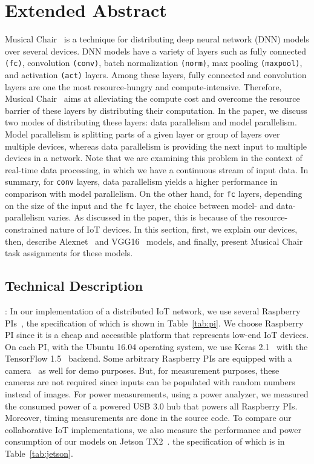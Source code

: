 \documentclass[sigplan]{acmart}
\begin{document}
\section{Extended Abstract}

Musical Chair~\cite{musical-chair} is a technique for distributing deep neural network (DNN) models over several devices. DNN models have a variety of layers such as fully connected \texttt{(fc)}, convolution \texttt{(conv)}, batch normalization \texttt{(norm)}, max pooling \texttt{(maxpool)}, and activation \texttt{(act)} layers. Among these layers, fully connected and convolution layers are one the most resource-hungry and compute-intensive. Therefore, Musical Chair~\cite{musical-chair} aims at alleviating the compute cost and overcome the resource barrier of these layers by distributing their computation. In the paper, we discuss two modes of distributing these layers: data parallelism and model parallelism. Model parallelism is splitting parts of a given layer or group of layers over multiple devices, whereas data parallelism is providing the next input to multiple devices in a network. Note that we are examining this problem in the context of real-time data processing, in which we have a continuous stream of input data. In summary, for \texttt{conv} layers, data parallelism yields a higher performance in comparison with model parallelism. On the other hand, for \texttt{fc} layers, depending on the size of the input and the \texttt{fc} layer, the choice between model- and data-parallelism varies. As discussed in the paper, this is because of the resource-constrained nature of IoT devices. In this section, first, we explain our devices, then, describe Alexnet~\cite{kri:sut12} and VGG16~\cite{sim:zis14-deep} models, and finally, present Musical Chair task assignments for these models.


\subsection{Technical Description}
%
%
%
: 
In our implementation of a distributed IoT network, we use several Raspberry PIs~\cite{pi3}, the specification of which is shown in Table~\ref{tab:pi}. We choose Raspberry PI since it is a cheap and accessible platform that represents low-end IoT devices. On each PI, with the Ubuntu 16.04 operating system, we use Keras 2.1~\cite{chollet2015keras} with the TensorFlow 1.5~\cite{tensorflow2015-whitepaper} backend. Some arbitrary Raspberry PIs are equipped with a camera~\cite{pi3-cam} as well for demo purposes. But, for measurement purposes, these cameras are not required since inputs can be populated with random numbers instead of images. For power measurements, using a power analyzer, we measured the consumed power of a powered USB 3.0 hub that powers all Raspberry PIs. Moreover, timing measurements are done in the source code. To compare our collaborative IoT implementations, we also measure the performance and power consumption of our models on Jetson TX2~\cite{jetson}. the specification of which is in Table~\ref{tab:jetson}.
\end{document}
